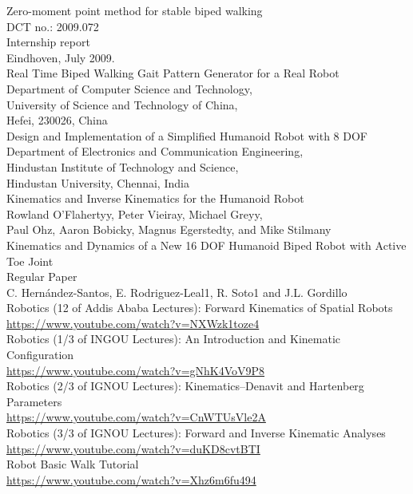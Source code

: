 \documentclass{article}
\begin{document}
 \begin{thebibliography}{99}
 	 Zero-moment point method for stable biped walking\\
 	DCT no.: 2009.072\\
 	Internship report\\
 	Eindhoven, July 2009.\\
 	
 	 Real Time Biped Walking Gait Pattern Generator for a Real Robot\\
 	Department of Computer Science and Technology,\\
 	University of Science and Technology of China,\\
 	Hefei, 230026, China\\
 	
 	 Design and Implementation of a Simplified Humanoid Robot with 8 DOF\\
 	Department of Electronics and Communication Engineering,\\ Hindustan Institute of
 	Technology and Science,\\ Hindustan University, Chennai, India\\
 	
 	 Kinematics and Inverse Kinematics for the Humanoid Robot\\
 	Rowland O’Flahertyy, Peter Vieiray, Michael Greyy,\\
 	Paul Ohz, Aaron Bobicky, Magnus Egerstedty, and Mike Stilmany\\
 	
 	 Kinematics and Dynamics of a New 16 DOF Humanoid Biped Robot with Active Toe Joint\\
 	Regular Paper\\
 	C. Hernández-Santos, E. Rodriguez-Leal1, R. Soto1 and J.L. Gordillo\\
 	
 	\newpage
 	 Robotics (12 of Addis Ababa Lectures): Forward Kinematics of Spatial Robots\\
 	\url{https://www.youtube.com/watch?v=NXWzk1toze4}\\
 	
 	Robotics (1/3 of INGOU Lectures): An Introduction and Kinematic Configuration\\
 	\url{https://www.youtube.com/watch?v=gNhK4VoV9P8}\\
 	
 	Robotics (2/3 of IGNOU Lectures): Kinematics--Denavit and Hartenberg Parameters\\
 	\url{https://www.youtube.com/watch?v=CnWTUsVle2A}\\
 	
 	Robotics (3/3 of IGNOU Lectures): Forward and Inverse Kinematic Analyses\\
 	\url{https://www.youtube.com/watch?v=duKD8cvtBTI}\\
 	
 	Robot Basic Walk Tutorial\\
 	\url{https://www.youtube.com/watch?v=Xhz6m6fu494}\\
 	
 \end{thebibliography}
 
\end{document}
